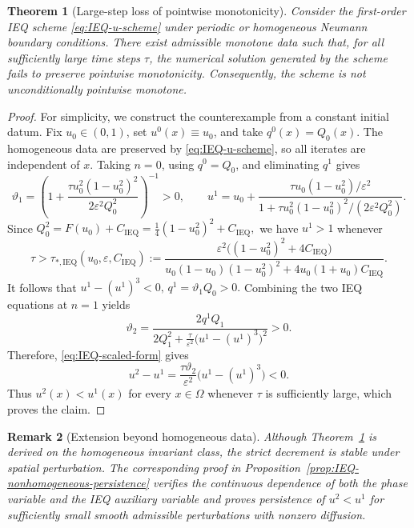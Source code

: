 \documentclass[final, 3p, times]{elsarticle}%
\newcommand{\eps}{\varepsilon}
\newtheorem{theorem}{Theorem}[section]
\newtheorem{remark}[theorem]{Remark}
\begin{document}
\begin{theorem}[Large-step loss of pointwise monotonicity]
\label{thm:IEQ-large-step-loss}
Consider the first-order IEQ scheme \eqref{eq:IEQ-u-scheme} under
periodic or homogeneous Neumann boundary conditions. There exist
admissible monotone data such that, for all sufficiently large time steps
\(\tau\), the numerical solution generated by the scheme fails to
preserve pointwise monotonicity. Consequently, the scheme is not
unconditionally pointwise monotone.
\end{theorem}

\begin{proof}
For simplicity, we construct the counterexample from a constant initial
datum. Fix \(u_0\in(0,1)\), set \(u^0(x)\equiv u_0\), and take
\(q^0(x)=Q_0(x)\). The homogeneous data are preserved by
\eqref{eq:IEQ-u-scheme}, so all iterates are independent of \(x\).
Taking \(n=0\), using \(q^0=Q_0\), and eliminating \(q^1\) gives
\begin{equation}
    \vartheta_1
    =\left(1+
    \frac{\tau u_0^2(1-u_0^2)^2}{2\eps^2Q_0^2}\right)^{-1}>0,
    \qquad
    u^1
    =u_0+\frac{\tau u_0(1-u_0^2)/\eps^2}
    {1+\tau u_0^2(1-u_0^2)^2/(2\eps^2Q_0^2)}.
    \label{eq:IEQ-u1-tau}
\end{equation}
Since
$
    Q_0^2=F(u_0)+C_{\mathrm{IEQ}}=\frac14(1-u_0^2)^2+C_{\mathrm{IEQ}},
$
we have \(u^1>1\) whenever
\begin{equation}
    \tau>\tau_{*,\mathrm{IEQ}}(u_0,\eps,C_{\mathrm{IEQ}})
    :=
    \frac{\eps^2\bigl((1-u_0^2)^2+4C_{\mathrm{IEQ}}\bigr)}
    {u_0(1-u_0)(1-u_0^2)^2+4u_0(1+u_0)C_{\mathrm{IEQ}}}.
    \label{eq:IEQ-thm-threshold}
\end{equation}
It follows that
$
    u^1-(u^1)^3<0,\, q^1=\vartheta_1Q_0>0.
$
Combining the two IEQ equations at \(n=1\) yields
\[
    \vartheta_2
    =\frac{2q^1Q_1}
    {2Q_1^2+\frac{\tau}{\eps^2}
    \bigl(u^1-(u^1)^3\bigr)^2}>0.
\]
Therefore, \eqref{eq:IEQ-scaled-form} gives
\[
    u^2-u^1
    =\frac{\tau\vartheta_2}{\eps^2}
    \bigl(u^1-(u^1)^3\bigr)<0.
\]
Thus \(u^2(x)<u^1(x)\) for every \(x\in\Omega\) whenever \(\tau\) is
sufficiently large, which proves the claim.
\end{proof}
\begin{remark}[Extension beyond homogeneous data]
Although Theorem~\ref{thm:IEQ-large-step-loss} is derived on the homogeneous
invariant class, the strict decrement is stable under spatial perturbation.
The corresponding proof in Proposition~\ref{prop:IEQ-nonhomogeneous-persistence}
verifies the continuous dependence of both the phase variable and the IEQ
auxiliary variable and proves persistence of \(u^2<u^1\) for sufficiently small smooth admissible
perturbations with nonzero diffusion.
\end{remark}
\end{document}

